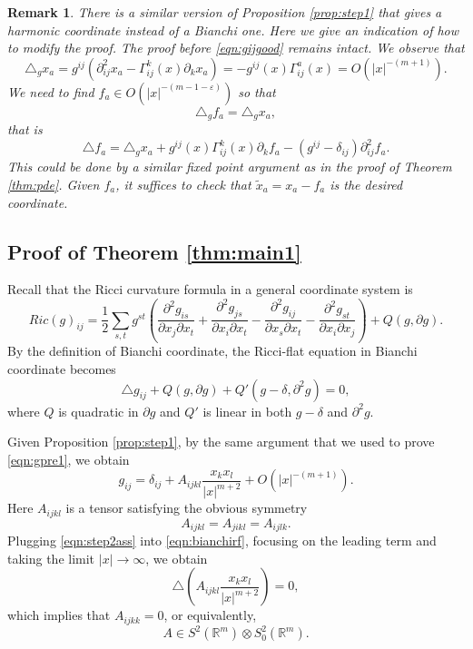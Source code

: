 \documentclass{amsart}
\newtheorem{rem}[thm]{Remark}
\newcommand{\abs}[1]{\left\vert#1\right\vert}
\newcommand{\Real}{\mathbb R}
\numberwithin{equation}{section}
\begin{document}
\begin{rem}
	There is a similar version of Proposition \ref{prop:step1} that gives a harmonic coordinate instead of a Bianchi one. Here we give an indication of how to modify the proof. The proof before \eqref{eqn:gijgood} remains intact. We observe that
	\[
		\triangle_g x_a = g^{ij}(\partial^2_{ij}x_a-\Gamma^k_{ij}(x)\partial_k x_a)=- g^{ij}(x)\Gamma_{ij}^a(x)=O(\abs{x}^{-(m+1)}).
	\]
	We need to find $f_a\in O(\abs{x}^{-(m-1-\varepsilon)})$ so that
	$$
	\triangle_g f_a = \triangle_g x_a,
	$$
	that is
	\[
		\triangle f_a = \triangle_g x_a + g^{ij}(x)\Gamma^k_{ij}(x)\partial_k f_a - (g^{ij}-\delta_{ij})\partial^2_{ij}f_a.
	\]
	This could be done by a similar fixed point argument as in the proof of Theorem \ref{thm:pde}. Given $f_a$, it suffices to check that $\tilde{x}_a=x_a-f_a$ is the desired coordinate.
\end{rem}

\subsection{Proof of Theorem \ref{thm:main1}}

Recall that the Ricci curvature formula in a general coordinate system is
\[
	Ric(g)_{ij}= \frac{1}{2}\sum_{s,t}g^{st} \left( \frac{\partial^2 g_{is}}{\partial x_j \partial x_t} + \frac{\partial^2 g_{js}}{\partial x_i \partial x_t} - \frac{\partial^2 g_{ij}}{\partial x_s \partial x_t} - \frac{\partial^2 g_{st}}{\partial x_i \partial x_j}\right) + Q(g,\partial g).
\]
By the definition of Bianchi coordinate, the Ricci-flat equation in Bianchi coordinate becomes
\begin{equation}
	\label{eqn:bianchirf}
	\triangle g_{ij} + Q(g,\partial g) + Q'(g-\delta,\partial^2 g)=0,
\end{equation}
where $Q$ is quadratic in $\partial g$ and $Q'$ is linear in both $g-\delta$ and $\partial^2 g$.

Given Proposition \ref{prop:step1}, by the same argument that we used to prove \eqref{eqn:gpre1}, we obtain 
\begin{equation}
	\label{eqn:step2ass}
	g_{ij}= \delta_{ij}+A_{ijkl}\frac{x_kx_l}{\abs{x}^{m+2}}+ O(\abs{x}^{-(m+1)}).
\end{equation}
Here $A_{ijkl}$ is a tensor satisfying the obvious symmetry
$$
A_{ijkl}=A_{jikl}=A_{ijlk}.
$$
Plugging \eqref{eqn:step2ass} into \eqref{eqn:bianchirf}, focusing on the leading term and taking the limit $\abs{x}\to \infty$, we obtain
\begin{equation}
	\label{eqn:step2hf}
	\triangle \left( A_{ijkl}\frac{x_kx_l}{\abs{x}^{m+2}} \right)=0,
\end{equation}
which implies that $A_{ijkk}=0$, or equivalently,
\[
	A\in S^2(\Real^m)\otimes S^2_0(\Real^m).
\]
\end{document}
